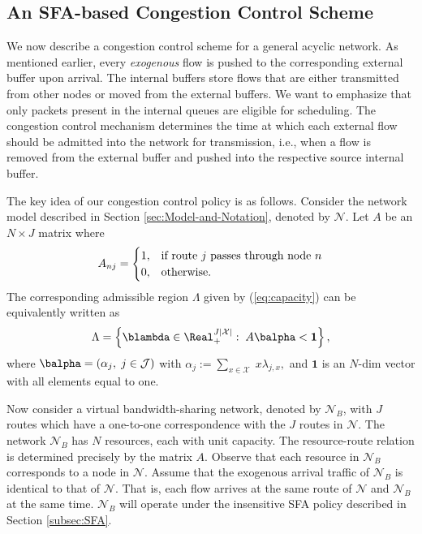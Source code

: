 \subsection{An SFA-based Congestion Control Scheme\label{subsec:congestion_control}}

We now describe a congestion control scheme for a general acyclic
network. As mentioned earlier, every \emph{exogenous} flow is pushed to the corresponding external buffer upon arrival. The internal buffers store flows that are either transmitted from other nodes or
moved from the external buffers. We want to emphasize that
only packets present in the internal queues are eligible
for scheduling. The congestion control mechanism determines the time
at which each external flow should be admitted into the network for
transmission, i.e., when a flow is removed from the external buffer
and pushed into the respective source internal buffer.  

The key idea of our congestion control policy is as follows. Consider
the network model described in Section \ref{sec:Model-and-Notation},
denoted by $\mathcal{N}$. Let $A$ be an $N\times J$ matrix where
\[
A_{nj}=\begin{cases}
1, & \text{if route \ensuremath{j} passes through node \ensuremath{n}}\\
0, & \text{otherwise.}
\end{cases}
\]
The corresponding admissible region $\Lambda$ given by (\ref{eq:capacity})
can be equivalently written as 
\[
\Lambda=\left\{ \blambda\in\Real_{+}^{J|\mathcal{X}|}:\;A\balpha<\boldsymbol{1}\right\} ,
\]
 where \emph{$\balpha=(\alpha_{j},\;j\in\mathcal{J})$ }with\emph{
$\alpha_{j}:=\sum_{x\in\mathcal{X}}\;x\lambda_{j,x},$ }and $\boldsymbol{1}$
is an $N$-dim vector with all elements equal to one. 

Now consider a virtual bandwidth-sharing network, denoted by \textbf{$\mathcal{N}_{B}$},\textbf{
}with $J$ routes which have a one-to-one correspondence with the
$J$ routes in $\mathcal{N}$. The network $\mathcal{N}_{B}$ has
$N$ resources, each with unit capacity. The resource-route relation
is determined precisely by the matrix $A.$ Observe that each resource
in $\mathcal{N}_{B}$ corresponds to a node in $\mathcal{N}.$ Assume
that the exogenous arrival traffic of \textbf{$\mathcal{N}_{B}$ }is
identical to that of $\mathcal{N}$. That is, each flow arrives at
the same route of $\mathcal{N}$\textbf{ }and\textbf{ $\mathcal{N}_{B}$
}at the same time. \textbf{$\mathcal{N}_{B}$ }will operate under
the insensitive SFA policy described in Section \ref{subsec:SFA}. 

